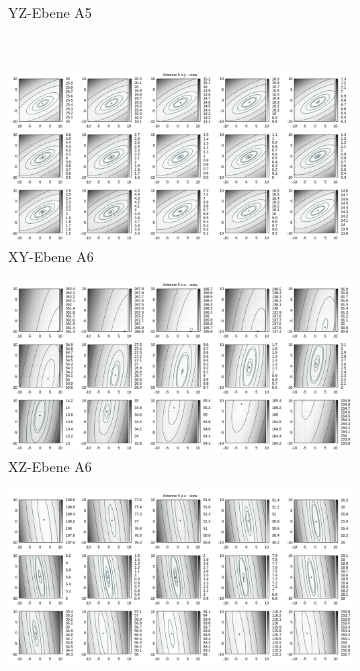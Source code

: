 \begin{appendix}
\begin{landscape}
\begin{figure}[!ht]
\begin{subfigure}[t]{0.5\textwidth}
					\caption{YZ-Ebene A5}
		\end{subfigure}
	\\
		\centering
		\begin{subfigure}[t]{0.5\textwidth}
		     \centering
		     \includegraphics[width=\textwidth]{img/fitness/xy/a5.png}
		             \caption{XY-Ebene A6}
		\end{subfigure}
		\begin{subfigure}[t]{0.5\textwidth}
			\centering
		     \includegraphics[width=\textwidth]{img/fitness/xz/a5.png}
					\caption{XZ-Ebene A6}
		\end{subfigure}
		\begin{subfigure}[t]{0.5\textwidth}
				\centering
		   \includegraphics[width=\textwidth]{img/fitness/yz/a5.png}

\end{subfigure}
\end{figure}
\end{landscape}
\end{appendix}
